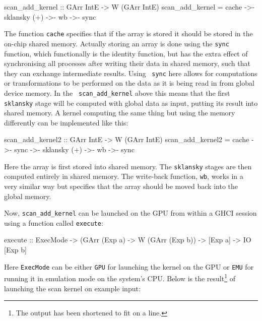 \begin{code}
scan_add_kernel :: GArr IntE -> W (GArr IntE) 
scan_add_kernel = cache ->- sklansky (+) ->- wb ->- sync
\end{code}
The function {\tt cache} specifies that if the array is stored it should be
stored in the on-chip shared memory. Actually storing an array is done using
the {\tt sync} function, which functionally is the identity function, but has
the extra effect of synchronising all processes after writing their data in
shared memory, such that they can exchange intermediate results. Using {\tt
sync} here allows for computations or transformations to be performed on the
data as it is being read in from global device memory. In the {\tt
scan\_add\_kernel} above this means that the first {\tt sklansky} stage will
be computed with global data as input, putting its result into shared memory.
A kernel computing the same thing but using the memory differently can be
implemented like this:
\begin{code}
scan_add_kernel2 :: GArr IntE -> W (GArr IntE) 
scan_add_kernel2 = cache ->- sync ->- sklansky (+) ->- 
                   wb ->- sync
\end{code}
Here the array is first stored into shared memory. The {\tt sklansky} stages
are then computed entirely in shared memory. The write-back function, {\tt wb}, 
works in a very similar way but specifies that the array should be moved back 
into the global memory. 

Now, {\tt scan\_add\_kernel} can be launched on the GPU from within a GHCI 
session using a function called {\tt execute}:

\begin{code}
execute :: ExecMode 
         -> (GArr (Exp a) -> W (GArr (Exp b)) 
         -> [Exp a] -> IO [Exp b]
\end{code}
Here {\tt ExecMode} can be either {\tt GPU} for launching the kernel on the 
GPU or {\tt EMU} for running it in emulation mode on the system's CPU. Below is 
the result\footnote{The output has been shortened to fit on a line.} of 
launching the scan kernel on example input:


